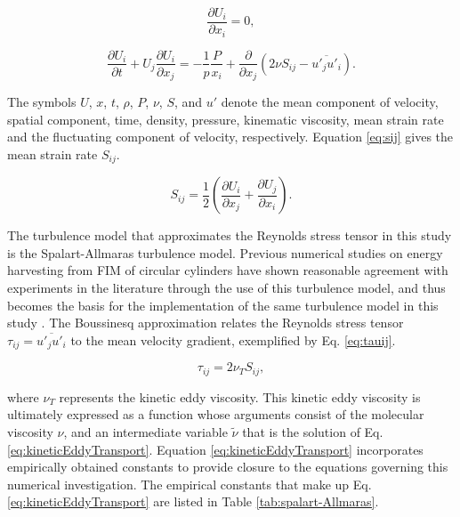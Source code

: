 \documentclass[oneside]{utmthesis}
\begin{document}
\begin{equation}
  \frac{\partial U_{i}}{\partial x_{i}}=0,
  \label{eq:continuity}
\end{equation}

\begin{equation}
  \frac{\partial U_{i}}{\partial t}+U_{j}\frac{\partial U_{i}}{\partial x_{j}} = -\frac{1}{p}\frac{P}{x_{i}}+\frac{\partial}{\partial x_{j}} \left( 2\nu S_{ij}-\overline{u'_{j}u'_{i}} \right).
  \label{eq:navier-stokes}
\end{equation}

\noindent The symbols $U$, $x$, $t$, $\rho$, $P$, $\nu$, $S$, and $u'$ denote the mean component of velocity, spatial component, time, density, pressure, kinematic viscosity, mean strain rate and the fluctuating component of velocity, respectively. Equation \ref{eq:sij} gives the mean strain rate $S_{ij}$.

\begin{equation}
  S_{ij} = \frac{1}{2} \left( \frac{\partial U_{i}}{\partial x_{j}} + \frac{\partial U_{j}}{\partial x_{i}} \right).
  \label{eq:sij}
\end{equation}

The turbulence model that approximates the Reynolds stress tensor in this study is the Spalart-Allmaras turbulence model. Previous numerical studies on energy harvesting from FIM of circular cylinders have shown reasonable agreement with experiments in the literature through the use of this turbulence model, and thus becomes the basis for the implementation of the same turbulence model in this study \citep{Ding2015a,Ding2015b}. The Boussinesq approximation relates the Reynolds stress tensor $\tau_{ij} = \overline{u'_{j}u'_{i}}$ to the mean velocity gradient, exemplified by Eq. \ref{eq:tauij}.

\begin{equation}
  \tau_{ij} = 2 \nu_{T}S_{ij},
  \label{eq:tauij}
\end{equation}

\noindent where $\nu_{T}$ represents the kinetic eddy viscosity. This kinetic eddy viscosity is ultimately expressed as a function whose arguments consist of the molecular viscosity $\nu$, and an intermediate variable $\tilde{\nu}$ that is the solution of Eq. \ref{eq:kineticEddyTransport}. Equation \ref{eq:kineticEddyTransport} incorporates empirically obtained constants to provide closure to the equations governing this numerical investigation. The empirical constants that make up Eq. \ref{eq:kineticEddyTransport} are listed in Table \ref{tab:spalart-Allmaras}.
\end{document}
